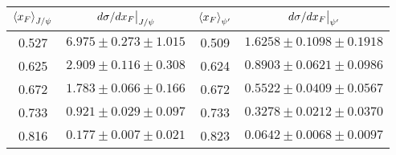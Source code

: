 \begin{tabular}{cc|cc}
\hline
$\expval{x_F}_{J/\psi}$    & $\eval{d\sigma/dx_F}_{J/\psi}$ & $\expval{x_F}_{\psi^\prime}$ & $\eval{d\sigma/dx_F}_{\psi^\prime}$                       \\ \hline
\multicolumn{1}{c|}{0.527} & $6.975\pm0.273\pm1.015$        & \multicolumn{1}{c|}{0.509}                        & $1.6258\pm0.1098\pm0.1918$           \\
\multicolumn{1}{c|}{0.625} & $2.909\pm0.116\pm0.308$        & \multicolumn{1}{c|}{0.624}                        & $0.8903\pm0.0621\pm0.0986$           \\
\multicolumn{1}{c|}{0.672} & $1.783\pm0.066\pm0.166$        & \multicolumn{1}{c|}{0.672}                        & $0.5522\pm0.0409\pm0.0567$           \\
\multicolumn{1}{c|}{0.733} & $0.921\pm0.029\pm0.097$        & \multicolumn{1}{c|}{0.733}                        & $0.3278\pm0.0212\pm0.0370$           \\
\multicolumn{1}{c|}{0.816} & $0.177\pm0.007\pm0.021$        & \multicolumn{1}{c|}{0.823}                        & $0.0642\pm0.0068\pm0.0097$           \\ \hline
\end{tabular}
